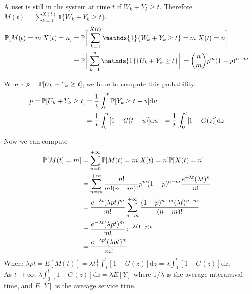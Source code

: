 A user is still in the system at time $t$ if $W_k + Y_k \geq t$. Therefore $M(t) = \sum\limits_{k=1}^{X(t)} \mathds{1}\{W_k + Y_k \geq t\} $.
\begin{equation}
	\begin{split}
		\prob[M(t)=m|X(t)=n] &= \prob\bigg[\sum\limits_{k=1}^{X(t)} \mathds{1}\{W_k + Y_k \geq t\} = m|X(t)=n\bigg] \\
		&= \prob\bigg[\sum\limits_{k=1}^{n} \mathds{1}\{U_k + Y_k \geq t\}\bigg] = {{n}\choose{m}}p^{m}(1-p)^{n-m}
	\end{split}
\end{equation}

Where $p = \mathbb{P}[U_k + Y_k \geq t]$, we have to compute this probability.
\begin{equation}
	\begin{split}
	 p = \mathbb{P}[U_k + Y_k \geq t] &= \frac{1}{t}\int_0^t \mathbb{P}[Y_k \geq t -u] \mathrm{d}u \\
	 &= \frac{1}{t}\int_0^t [1 - G(t-u)] \mathrm{d}u
	 &= \frac{1}{t}\int_0^t [1 - G(z)] \mathrm{d}z
	\end{split}
\end{equation}

Now we can compute
\begin{equation}
	\begin{split}
		\mathbb{P}[M(t)=m] &= \sum\limits_{n=0}^{+\infty} \mathbb{P}[M(t)=m|X(t)=n]\mathbb{P}[X(t)=n] \\
		&= \sum\limits_{n=m}^{+\infty} \frac{n!}{m!(n-m)!}p^m(1-p)^{n-m}\frac{e^{-\lambda t} (\lambda t)^n}{n!} \\
		&= \frac{e^{-\lambda t} (\lambda p t)^m}{m!}\sum\limits_{n=m}^{+\infty} \frac{(1-p)^{n-m}(\lambda t)^{n-m}}{(n-m)!}\\
		&= \frac{e^{-\lambda t} (\lambda p t)^m}{m!} e^{-\lambda(1-p)t}\\
		&= \frac{e^{-\lambda p t}(\lambda p t)^m}{m!}
	\end{split}
\end{equation}
Where $\lambda p t = E[M(t)] = \lambda t \frac{1}{t} \int_0^t [1 - G(z)] \mathrm{d}z = \lambda \int_0^t [1 - G(z)] \mathrm{d}z$. \\
As $t \rightarrow \infty$: $\lambda \int_0^t [1 - G(z)] \mathrm{d}z = \lambda E[Y]$ where $1/\lambda$ is the average interarrival time, and $E[Y]$ is the average service time.


